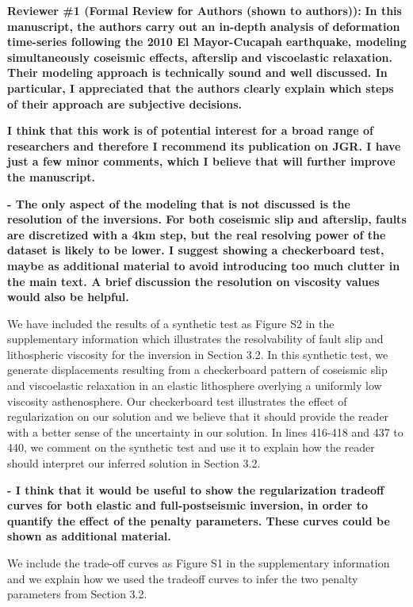 \documentclass[10pt,a4paper]{letter}
\begin{document}
\begin{letter}{}
\textbf{Reviewer \#1 (Formal Review for Authors (shown to authors)):}\newline
\textbf{In this manuscript, the authors carry out an in-depth analysis of deformation time-series following the 2010 El Mayor-Cucapah earthquake, modeling simultaneously coseismic effects, afterslip and viscoelastic relaxation. Their modeling approach is technically sound and well discussed. In particular, I appreciated that the authors clearly explain which steps of their approach are subjective decisions.}

\textbf{I think that this work is of potential interest for a broad range of researchers and therefore I recommend its publication on JGR. I have just a few minor comments, which I believe that will further improve the manuscript.}

\textbf{- The only aspect of the modeling that is not discussed is the resolution of the inversions. For both coseismic slip and afterslip, faults are discretized with a 4km step, but the real resolving power of the dataset is likely to be lower. I suggest showing a checkerboard test, maybe as additional material to avoid introducing too much clutter in the main text. A brief discussion the resolution on viscosity values would also be helpful.}

We have included the results of a synthetic test as Figure S2 in the supplementary information which illustrates the resolvability of fault slip and lithospheric viscosity for the inversion in Section 3.2.  In this synthetic test, we generate displacements resulting from a checkerboard pattern of coseismic slip and viscoelastic relaxation in an elastic lithosphere overlying a uniformly low viscosity asthenosphere.  Our checkerboard test illustrates the effect of regularization on our solution and we believe that it should provide the reader with a better sense of the uncertainty in our solution.  In lines 416-418 and 437 to 440, we comment on the synthetic test and use it to explain how the reader should interpret our inferred solution in Section 3.2. 

\textbf{- I think that it would be useful to show the regularization tradeoff curves for both elastic and full-postseismic inversion, in order to quantify the effect of the penalty parameters. These curves could be shown as additional material.}

We include the trade-off curves as Figure S1 in the supplementary information and we explain how we used the tradeoff curves to infer the two penalty parameters from Section 3.2.


\end{letter}
\end{document}
